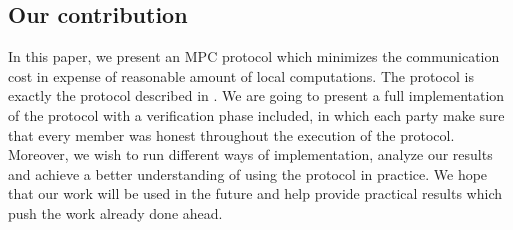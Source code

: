 \documentclass[12pt]{article}
\begin{document}
\subsection{Our contribution}
In this paper, we present an MPC protocol which minimizes the communication cost in expense of reasonable amount of local computations. The protocol is exactly the protocol described in \cite{main}. We are going to  present a full implementation of the protocol with a verification phase included, in which each party make sure that every member was honest throughout the execution of the protocol.
Moreover, we wish to run different ways of implementation, analyze our results and achieve a better understanding of using the protocol in practice. We hope that our work will be used in the future and help provide practical results which push the work already done ahead.

 
\end{document}

